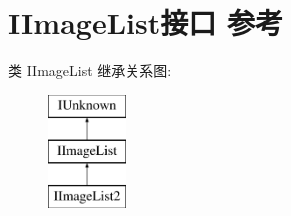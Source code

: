 \hypertarget{interface_i_image_list}{}\section{I\+Image\+List接口 参考}
\label{interface_i_image_list}
类 I\+Image\+List 继承关系图\+:\begin{figure}[H]
\begin{center}
\leavevmode
\includegraphics[height=3.000000cm]{interface_i_image_list}
\end{center}
\end{figure}

